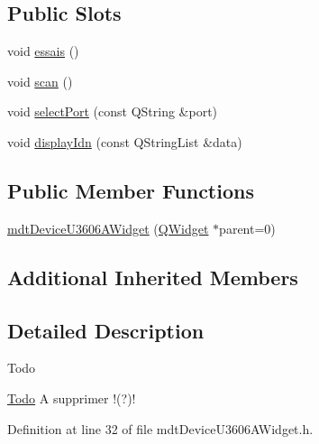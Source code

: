 \subsection*{Public Slots}
\begin{DoxyCompactItemize}
\item 
void \hyperlink{classmdt_device_u3606_a_widget_aa232cf25e8ac0dee00cde5089af623b0}{essais} ()
\item 
void \hyperlink{classmdt_device_u3606_a_widget_abc2b2860e71a9c79af6697205ead2a84}{scan} ()
\item 
void \hyperlink{classmdt_device_u3606_a_widget_a15409aed9aa73929b64be63db9f31f8e}{select\-Port} (const Q\-String \&port)
\item 
void \hyperlink{classmdt_device_u3606_a_widget_a3e979d85d5e198a97b36b4956d06ce8e}{display\-Idn} (const Q\-String\-List \&data)
\end{DoxyCompactItemize}
\subsection*{Public Member Functions}
\begin{DoxyCompactItemize}
\item 
\hyperlink{classmdt_device_u3606_a_widget_a653d85749d67555d8c3a43a779b6d2a2}{mdt\-Device\-U3606\-A\-Widget} (\hyperlink{class_q_widget}{Q\-Widget} $\ast$parent=0)
\end{DoxyCompactItemize}
\subsection*{Additional Inherited Members}


\subsection{Detailed Description}
\begin{DoxyRefDesc}{Todo}
\item[\hyperlink{todo__todo000006}{Todo}]A supprimer !(?)! \end{DoxyRefDesc}


Definition at line 32 of file mdt\-Device\-U3606\-A\-Widget.\-h.




